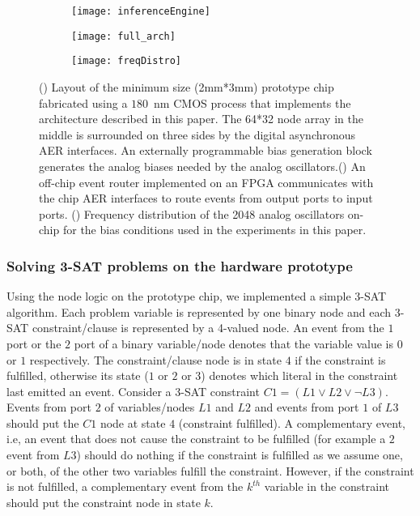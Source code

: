 \documentclass[10pt]{article}
\begin{document}
\begin{figure}[h]
 \centering

 \begin{subfigure}[b]{0.3\textwidth}
      \texttt{[image: inferenceEngine]} 
      \subcaption{}
      \label{fig:arch_a}
    \end{subfigure}
    \quad
 \begin{subfigure}[b]{0.3\textwidth}
     \texttt{[image: full\_arch]} 
     \subcaption{}
     \label{fig:arch_b}
   \end{subfigure}
   \quad
   \begin{subfigure}[b]{0.3\textwidth}
     \texttt{[image: freqDistro]} 
     \subcaption{}
     \label{fig:arch_c}
   \end{subfigure}


   \caption{() Layout of the minimum size (2mm*3mm) prototype chip fabricated using a $180$\, nm CMOS process that implements the architecture described in this paper. The 64*32 node array in the middle is surrounded on three sides by the digital asynchronous AER interfaces. An externally programmable bias generation block generates the analog biases needed by the analog oscillators.() An off-chip event router implemented on an FPGA communicates with the chip AER interfaces to route events from output ports to input ports. () Frequency distribution of the 2048 analog oscillators on-chip for the bias conditions used in the experiments in this paper.}
\label{fig:arch}
\end{figure}	

\subsubsection*{Solving 3-SAT problems on the hardware prototype}
Using the node logic on the prototype chip, we implemented a simple 3-SAT algorithm. Each problem variable is represented by one binary node and each 3-SAT constraint/clause is represented by a 4-valued node. An event from the $1$ port or the $2$ port of a binary variable/node denotes that the variable value is $0$ or $1$ respectively. The constraint/clause node is in state $4$ if the constraint is fulfilled, otherwise its state ($1$ or $2$ or $3$) denotes which literal in the constraint last emitted an event. Consider a 3-SAT constraint $C1 = (L1 \vee L2 \vee \neg L3)$. Events from port $2$ of variables/nodes $L1$ and $L2$ and events from port $1$ of $L3$ should put the $C1$ node at state $4$ (constraint fulfilled). A complementary event, i.e, an event that does not cause the constraint to be fulfilled (for example a $2$ event from $L3$) should do nothing if the constraint is fulfilled as we assume one, or both, of the other two variables fulfill the constraint. However, if the constraint is not fulfilled, a complementary event from the $k^{th}$ variable in the constraint should put the constraint node in state $k$. 
\end{document}
